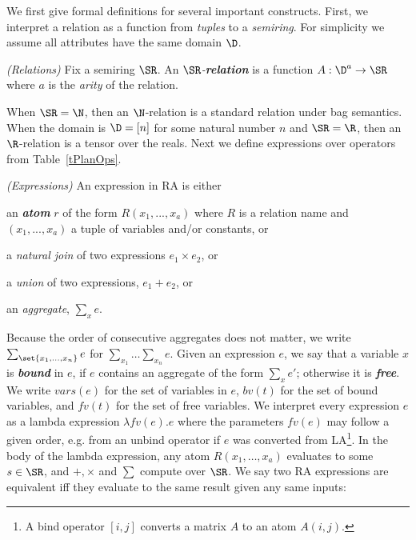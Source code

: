 
We first give formal definitions for several important constructs. First, we interpret a relation as a function from {\em tuples} to a {\em semiring}. For simplicity we assume all attributes have the same domain $\D$. 
\begin{defn}{{\em (Relations)}}
  Fix a semiring $\SR$.  An {\em $\SR$-\textbf{relation}} is a function $A: \D^a \rightarrow \SR$ where $a$ is the {\em arity} of the relation.
\end{defn}
When $\SR=\N$, then an $\N$-relation is a standard relation under bag semantics. When the domain is $\D = [n]$ for some natural number $n$ and $\SR=\R$, then an $\R$-relation is a tensor over the reals.  Next we define expressions over operators from Table~\ref{tPlanOps}. 

\begin{defn}{{\em (Expressions)}}\label{raexpr}
An expression in RA is either \begin{enumerate*}
    \item an \emph{\textbf{atom}} $r$ of the form $R(x_1, ..., x_a)$ where $R$ is a relation name and $(x_1, ..., x_a)$ a tuple of variables and/or constants, or
    \item a {\em natural join} of two expressions $e_1 \times e_2$, or 
    \item a {\em  union} of two expressions, $e_1 + e_2$, or
    \item an {\em aggregate},  $\sum_x e$. 
\end{enumerate*}{}
\end{defn}{}
Because the order of consecutive aggregates does not matter, we write $\sum_{\set{x_1, \dots, x_n}} e$ for $\sum_{x_1} \dots \sum_{x_n} e$. 
Given an expression $e$, we say that a variable $x$ is \emph{\textbf{bound}} in $e$, if $e$ contains an aggregate of the form $\sum_x e'$; 
otherwise it is \emph{\textbf{free}}. We write $vars(e)$ for the set of variables in $e$, $bv(t)$ for the set of bound variables, and $fv(t)$ for the set of free variables.
We interpret every expression $e$ as a lambda expression $\lambda fv(e) . e$ where the parameters $fv(e)$ may follow a given order, e.g. from an unbind operator if $e$ was converted from LA\footnote{A bind operator $[i,j]$ converts a matrix $A$ to an atom $A(i,j)$.}.
 In the body of the lambda expression, any atom $R(x_1, \dots , x_a)$ evaluates to some $s \in \SR$, and $+, \times$ and $\sum$ compute over $\SR$. We say two RA expressions are equivalent iff they evaluate to the same result given any same inputs: 

